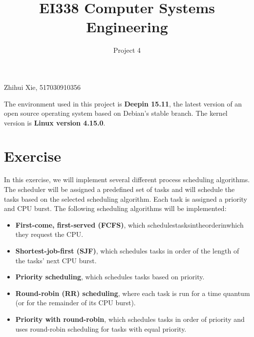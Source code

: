 \documentclass{article}
\title{EI338 Computer Systems Engineering}
\author{Project 4}
\begin{document}
\maketitle

\begin{center}
    Zhihui Xie, 517030910356
\end{center}

The environment used in this project is \textbf{Deepin 15.11}, the latest version of an open source operating system based on Debian's stable branch. The kernel version is \textbf{Linux version 4.15.0}.

\section*{Exercise}
In this exercise, we will implement several different process scheduling algorithms. The scheduler will be assigned a predefined set of tasks and will
schedule the tasks based on the selected scheduling algorithm. Each task is
assigned a priority and CPU burst. The following scheduling algorithms will
be implemented:

\begin{itemize}
    \item \textbf{First-come, first-served (FCFS)}, which schedulestasksintheorderinwhich
    they request the CPU.

    \item \textbf{Shortest-job-first (SJF)}, which schedules tasks in order of the length of the
    tasks’ next CPU burst.

    \item \textbf{Priority scheduling}, which schedules tasks based on priority.
    
    \item \textbf{Round-robin (RR) scheduling}, where each task is run for a time quantum
    (or for the remainder of its CPU burst).

    \item \textbf{Priority with round-robin}, which schedules tasks in order of priority and
    uses round-robin scheduling for tasks with equal priority.
\end{itemize}
\end{document}
